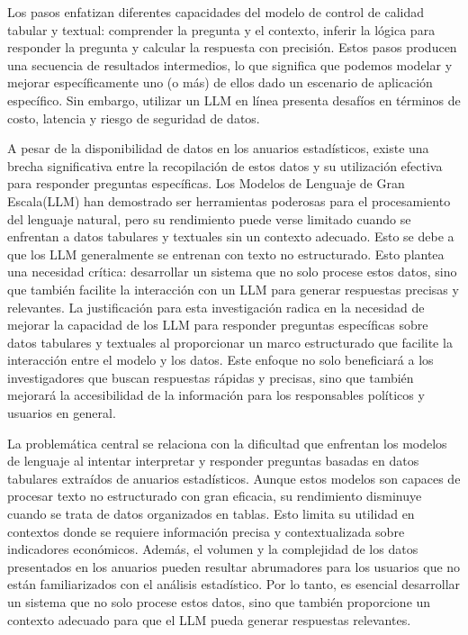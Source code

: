 Los pasos enfatizan diferentes capacidades del modelo de control de calidad tabular y textual: comprender la pregunta y el contexto, inferir la lógica para responder la pregunta y calcular la respuesta con precisión. Estos pasos producen una secuencia de resultados intermedios, lo que significa que podemos modelar y mejorar específicamente uno (o más) de ellos dado un escenario de aplicación específico. Sin embargo, utilizar un LLM en línea presenta desafíos en términos de costo, latencia y riesgo de seguridad de datos. 

A pesar de la disponibilidad de datos en los anuarios estadísticos, existe una brecha significativa entre la recopilación de estos datos y su utilización efectiva para responder preguntas específicas. Los Modelos de Lenguaje de Gran Escala(LLM) han demostrado ser herramientas poderosas para el procesamiento del lenguaje natural, pero su rendimiento puede verse limitado cuando se enfrentan a datos tabulares y textuales sin un contexto adecuado. Esto se debe a que los LLM generalmente se entrenan con texto no estructurado. Esto plantea una necesidad crítica: desarrollar un sistema que no solo procese estos datos, sino que también facilite la interacción con un LLM para generar respuestas precisas y relevantes.
La justificación para esta investigación radica en la necesidad de mejorar la capacidad de los LLM para responder preguntas específicas sobre datos tabulares y textuales al proporcionar un marco estructurado que facilite la interacción entre el modelo y los datos. Este enfoque no solo beneficiará a los investigadores que buscan respuestas rápidas y precisas, sino que también mejorará la accesibilidad de la información para los responsables políticos y usuarios en general.

La problemática central se relaciona con la dificultad que enfrentan los modelos de lenguaje al intentar interpretar y responder preguntas basadas en datos tabulares extraídos de anuarios estadísticos. Aunque estos modelos son capaces de procesar texto no estructurado con gran eficacia, su rendimiento disminuye cuando se trata de datos organizados en tablas. Esto limita su utilidad en contextos donde se requiere información precisa y contextualizada sobre indicadores económicos.
Además, el volumen y la complejidad de los datos presentados en los anuarios pueden resultar abrumadores para los usuarios que no están familiarizados con el análisis estadístico. Por lo tanto, es esencial desarrollar un sistema que no solo procese estos datos, sino que también proporcione un contexto adecuado para que el LLM pueda generar respuestas relevantes.

